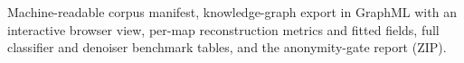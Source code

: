 Machine-readable corpus manifest, knowledge-graph export in GraphML with an
interactive browser view, per-map reconstruction metrics and fitted fields,
full classifier and denoiser benchmark tables, and the anonymity-gate report
(ZIP).
